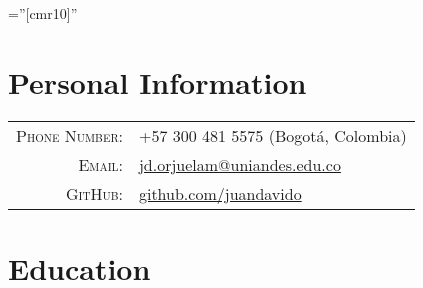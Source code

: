 \documentclass[a4paper,10pt]{article} %
\begin{document}
\pagestyle{empty} %

\font\fb=''[cmr10]'' %



\par{ \bigskip\par} %
\par{\bigskip\par} %

\color{OrangeRed}
\section{Personal Information}
\color{black}

\begin{tabular}{rl}
\textsc{Phone Number:} & +57 300 481 5575 (Bogot\'a, Colombia)\\
\textsc{Email:} & \href{mailto:jd.orjuelam@uniandes.edu.co}{jd.orjuelam@uniandes.edu.co}\\
\textsc{GitHub:} & \url{github.com/juandavido}
\end{tabular}


\color{OrangeRed}
\section{Education}
\color{black}
\end{document}
